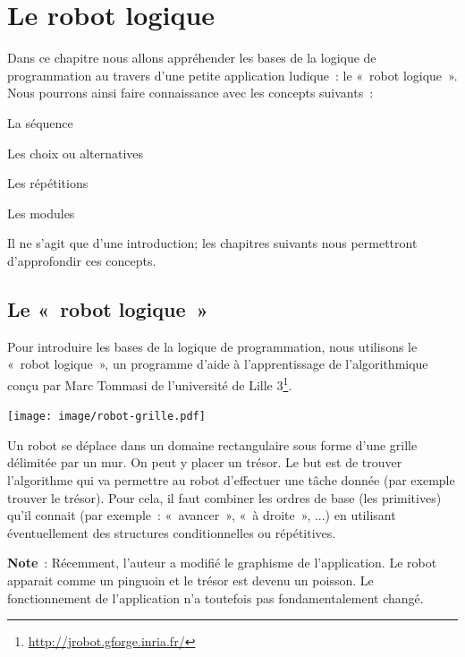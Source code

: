 \chapter{Le robot logique }

	Dans ce chapitre nous allons appréhender les bases de la logique de
	programmation au travers d'une petite application
	ludique~: le «~robot logique~». Nous pourrons ainsi faire connaissance
	avec les concepts suivants~:
	
	\begin{liste}
	\item La séquence
	\item Les choix ou alternatives
	\item Les répétitions
	\item Les modules
	\end{liste}

	Il ne s'agit que d'une introduction;
	les chapitres suivants nous permettront d'approfondir
	ces concepts.

\section{Le «~robot logique~»}

	Pour introduire les bases de la logique de programmation, nous utilisons
	le «~robot logique~», un programme d'aide à
	l'apprentissage de l'algorithmique conçu par Marc Tommasi
	de l'université de Lille
	3\footnote{\url{http://jrobot.gforge.inria.fr/}}.
	
	\begin{multicols}{2}
	\texttt{[image: image/robot-grille.pdf]}

	Un robot se déplace dans un domaine rectangulaire sous 
	forme d'une grille délimitée par un mur.
	On peut y placer un trésor. Le but est de trouver
	l'algorithme qui va permettre au robot
	d'effectuer une tâche donnée (par exemple trouver le
	trésor). Pour cela, il faut combiner les ordres de base (les
	primitives) qu'il connait (par exemple~: «~avancer~»,
	«~à droite~», ...) en utilisant éventuellement des structures
	conditionnelles ou répétitives.

	\end{multicols}
	
	\textbf{Note}~: Récemment, l'auteur a modifié le graphisme de l'application.
	Le robot apparait comme un pinguoin et le trésor est
	devenu un poisson. 
	Le fonctionnement de l'application n'a toutefois pas 
	fondamentalement changé.

